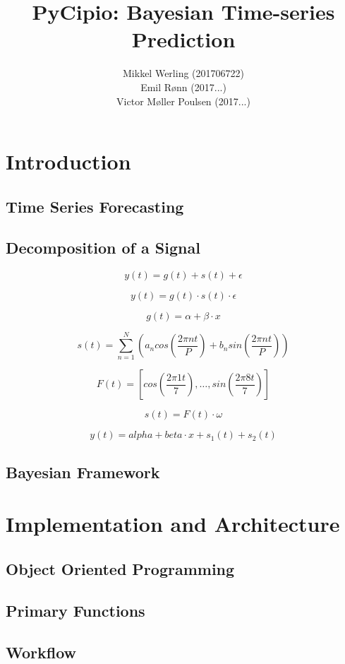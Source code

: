 \documentclass{article}
\title{PyCipio: Bayesian Time-series Prediction}
\author{Mikkel Werling (201706722) \\
    Emil Rønn (2017...) \\
    Victor Møller Poulsen (2017...)}
\date{}
\begin{document}
\maketitle
\section{Introduction}
\subsection{Time Series Forecasting}
\subsection{Decomposition of a Signal}

$$y(t) = g(t) + s(t) + \epsilon$$

$$y(t) = g(t) \cdot s(t) \cdot \epsilon $$

$$g(t) = \alpha + \beta \cdot x$$

$$s(t) = \sum _{n=1} ^N \left( a_n cos(\frac{2 \pi n t}{P}) + b_n sin(\frac{2 \pi n t}{P}) \right)$$

$$F(t) = \left[ cos(\frac{2 \pi 1 t}{7}), \dots, sin(\frac{2 \pi 8 t}{7}) \right]$$

$$s(t) = F(t) \cdot \omega$$

$$y(t) = alpha + beta \cdot x + s_1(t) + s_2(t)$$

\subsection{Bayesian Framework}

\section{Implementation and Architecture}

\subsection{Object Oriented Programming}

\subsection{Primary Functions}

\subsection{Workflow}
\end{document}
